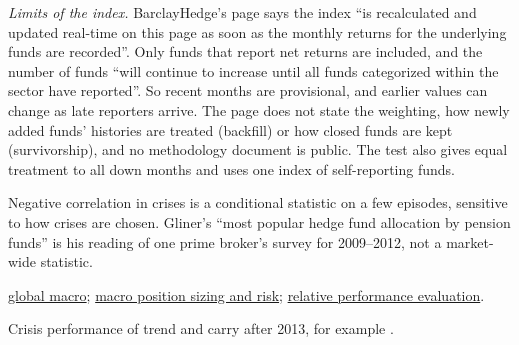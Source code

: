 \begin{qfevidence}
\emph{Limits of the index.} BarclayHedge's page says the index ``is recalculated and updated real-time on this page as soon as the monthly returns for the underlying funds are recorded''. Only funds that report net returns are included, and the number of funds ``will continue to increase until all funds categorized within the sector have reported''. So recent months are provisional, and earlier values can change as late reporters arrive. The page does not state the weighting, how newly added funds' histories are treated (backfill) or how closed funds are kept (survivorship), and no methodology document is public. The test also gives equal treatment to all down months and uses one index of self-reporting funds.

Negative correlation in crises is a conditional statistic on a few episodes, sensitive to how crises are chosen. Gliner's ``most popular hedge fund allocation by pension funds'' is his reading of one prime broker's survey for 2009--2012, not a market-wide statistic.

 \hyperref[def:global-macro-strategy]{global macro}; \hyperref[meth:macro-position-sizing-risk]{macro position sizing and risk}; \hyperref[meth:relative-performance-evaluation]{relative performance evaluation}.

 Crisis performance of trend and carry after 2013, for example \citep{wide-harvey-worst-times}.

\end{qfevidence}

